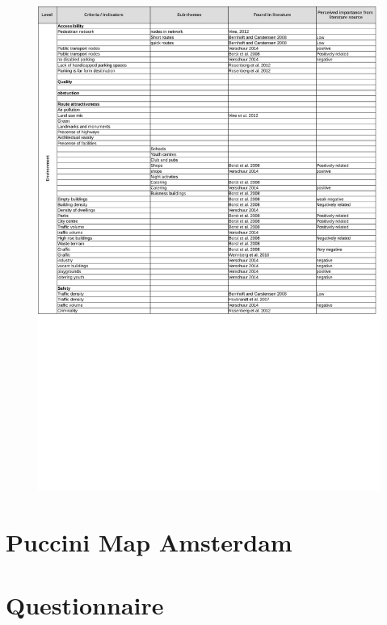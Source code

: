\begin{appendix}
\begin{figure}[h]
\includegraphics[width=\textwidth]{img/annex/A4_environment_criteria.pdf}
\end{figure}

\clearpage

\section{Puccini Map Amsterdam}
\label{pucciniMap}
\clearpage

\section{Questionnaire}\label{Aquest}

\clearpage


\end{appendix}
